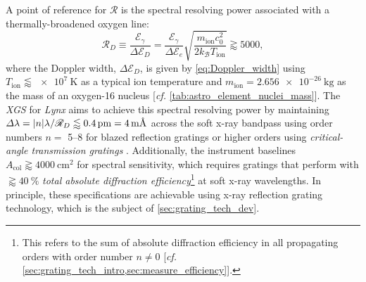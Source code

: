 A point of reference for $\mathscr{R}$ is the spectral resolving power associated with a thermally-broadened oxygen line: 
\begin{equation}
 \mathscr{R}_D \equiv \frac{\mathcal{E}_{\gamma}}{\Delta \mathcal{E}_D} = \frac{\mathcal{E}_{\gamma}}{\Delta \mathcal{E}_e} \sqrt{\frac{m_{\text{ion}} c_0^2}{2 k_{\mathcal{B}} T_{\text{ion}}}} \gtrapprox 5000 , 
 \end{equation}
where the Doppler width, $\Delta \mathcal{E}_D$, is given by \cref{eq:Doppler_width} using $T_{\text{ion}} \lessapprox \SI{e7}{\kelvin}$ as a typical ion temperature and $m_{\text{ion}} = \SI{2.656e-26}{\kilogram}$ as the mass of an oxygen-16 nucleus [\emph{cf.\@} \cref{tab:astro_element_nuclei_mass}]. 
The \emph{XGS} for \emph{Lynx} aims to achieve this spectral resolving power by maintaining $\Delta \lambda = \abs{n} \lambda / \mathscr{R}_D \lessapprox \SI{0.4}{\pico\metre} = \SI{4}{\milli\angstrom}$ across the soft x-ray bandpass using order numbers $n =$ \numrange{5}{8} for blazed reflection gratings \cite{McEntaffer19} or higher orders using \emph{critical-angle transmission gratings} \cite{Gunther19}. 
Additionally, the instrument baselines $A_{\text{col}} \gtrapprox \SI{4000}{\cm\squared}$ for spectral sensitivity, which requires gratings that perform with $\gtrapprox \SI{40}{\percent}$ \emph{total absolute diffraction efficiency}\footnote{This refers to the sum of absolute diffraction efficiency in all propagating orders with order number $n \neq 0$ [\emph{cf.\@} \cref{sec:grating_tech_intro,sec:measure_efficiency}].} at soft x-ray wavelengths. 
In principle, these specifications are achievable using x-ray reflection grating technology, which is the subject of \cref{sec:grating_tech_dev}. 

